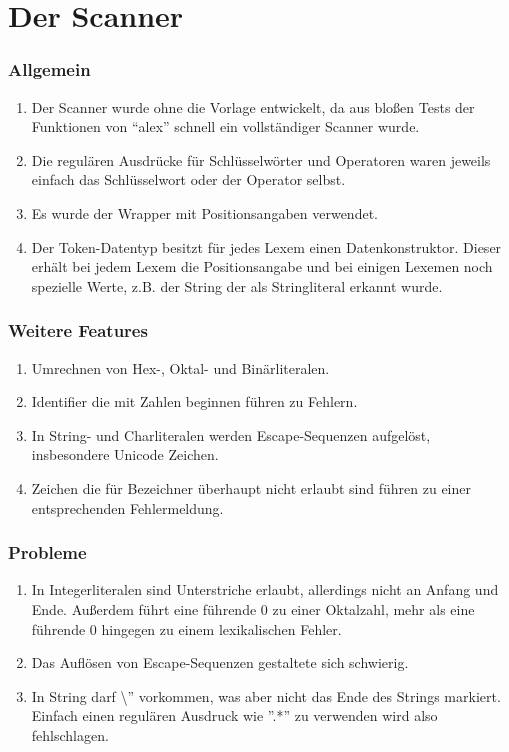 \documentclass{beamer}
\begin{document}
  
  \section{Der Scanner}
  \frame{\tableofcontents[currentsection]}
  
  \begin{frame} %
    \frametitle{Allgemein} %
    \begin{enumerate}
      \item Der Scanner wurde ohne die Vorlage entwickelt, da aus bloßen Tests der Funktionen von ``alex'' schnell ein vollständiger Scanner wurde.
      \item Die regulären Ausdrücke für Schlüsselwörter und Operatoren waren jeweils einfach das Schlüsselwort oder der Operator selbst. 
      \item Es wurde der Wrapper mit Positionsangaben verwendet.
      \item Der Token-Datentyp besitzt für jedes Lexem einen Datenkonstruktor. Dieser erhält bei jedem Lexem die Positionsangabe und bei einigen Lexemen noch spezielle Werte, z.B. der String der als Stringliteral erkannt wurde.
    \end{enumerate}
  \end{frame}
  \begin{frame} %
    \frametitle{Weitere Features} %
    \begin{enumerate}
     \item Umrechnen von Hex-, Oktal- und Binärliteralen.
     \item Identifier die mit Zahlen beginnen führen zu Fehlern.
     \item In String- und Charliteralen werden Escape-Sequenzen aufgelöst, insbesondere Unicode Zeichen.
     \item Zeichen die für Bezeichner überhaupt nicht erlaubt sind führen zu einer entsprechenden Fehlermeldung.
    \end{enumerate}
  \end{frame}
  \begin{frame} %
    \frametitle{Probleme} %
    \begin{enumerate}
      \item In Integerliteralen sind Unterstriche erlaubt, allerdings nicht an Anfang und Ende. Außerdem führt eine führende 0 zu einer Oktalzahl, mehr als eine führende 0 hingegen zu einem lexikalischen Fehler.
      \item Das Auflösen von Escape-Sequenzen gestaltete sich schwierig.
      \item In String darf \textbackslash '' vorkommen, was aber nicht das Ende des Strings markiert. Einfach einen regulären Ausdruck wie ''.*'' zu verwenden wird also fehlschlagen.
    \end{enumerate}
  \end{frame}
  
\end{document}
